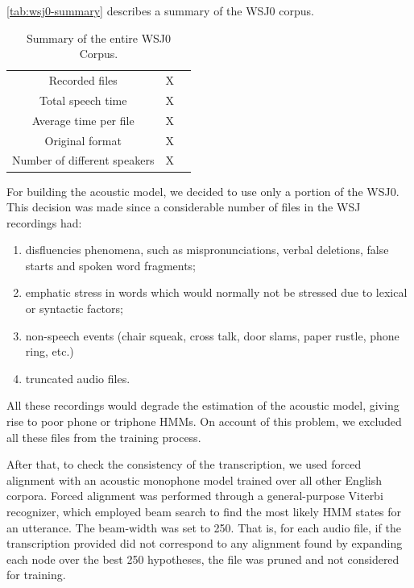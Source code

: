 \autoref{tab:wsj0-summary} describes a summary of the WSJ0 corpus.

\begin{table}[!htb]
\caption[Summary of the entire WSJ0 Corpus.]{Summary of the entire WSJ0 Corpus.}
\smallskip
\centering
\begin{tabular}{ccc} \toprule
  Recorded files & X \\
  Total speech time & X \\
  Average time per file & X \\
  Original format & X \\
  Number of different speakers & X \\
  \bottomrule
\end{tabular}
\label{tab:wsj0-summary}
\end{table}

For building the acoustic model, we decided to use only a portion of the WSJ0. This decision was made 
since a considerable number of files in the WSJ recordings had:

\begin{enumerate}
 \item disfluencies phenomena, such as mispronunciations, verbal deletions, false starts and spoken word fragments; 
 \item emphatic stress in words which would normally not be stressed due to lexical or syntactic factors;
 \item non-speech events (chair squeak, cross talk, door slams, paper rustle, phone ring, etc.)
 \item truncated audio files.
\end{enumerate}

All these recordings would degrade the estimation of the acoustic model, giving rise to poor phone or 
triphone \ac{HMM}s. On account of this problem, we excluded all these files from the training process.

After that, to check the consistency of the transcription, we used forced alignment with an acoustic
monophone model trained over all other English corpora. Forced alignment was performed through 
a general-purpose Viterbi recognizer, which employed beam search to find the most likely \ac{HMM} states 
for an utterance. The beam-width was set to 250. That is, for each audio file, if the transcription provided 
did not correspond to any alignment found by expanding each node over the best 250 hypotheses, 
the file was pruned and not considered for training.




